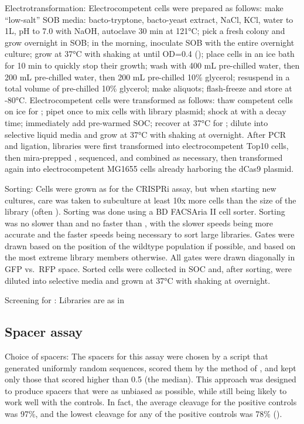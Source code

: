 \documentclass[10pt,oneside]{article}
\begin{document}
Electrotransformation: Electrocompetent cells were prepared as follows: make ``low-salt'' SOB media:  bacto-tryptone,  bacto-yeast extract,   NaCl,   KCl, water to 1L, pH to 7.0 with NaOH, autoclave 30 min at 121°C; pick a fresh colony and grow overnight in  SOB; in the morning, inoculate  SOB with the entire overnight culture; grow at 37°C with shaking at  until OD=0.4 (); place cells in an ice bath for 10 min to quickly stop their growth; wash with 400 mL pre-chilled water, then 200 mL pre-chilled water, then 200 mL pre-chilled 10\% glycerol; resuspend in a total volume of  pre-chilled 10\% glycerol; make  aliquots; flash-freeze and store at -80°C.  Electrocompetent cells were transformed as follows: thaw competent cells on ice for ; pipet once to mix cells with   library plasmid; shock at  with a  decay time; immediately add  pre-warmed SOC; recover at 37°C for ; dilute into selective liquid media and grow at 37°C with shaking at  overnight.  After PCR and ligation, libraries were first transformed into electrocompetent Top10 cells, then mira-prepped \autocite{pronobis2016}, sequenced, and combined as necessary, then transformed again into electrocompetent MG1655 cells already harboring the dCas9 plasmid.

Sorting: Cells were grown as for the CRISPRi assay, but when starting new  cultures, care was taken to subculture at least 10x more cells than the size of the library (often ).  Sorting was done using a BD FACSAria II cell sorter.  Sorting was no slower than  and no faster than , with the slower speeds being more accurate and the faster speeds being necessary to sort large libraries.  Gates were drawn based on the position of the wildtype population if possible, and based on the most extreme library members otherwise.  All gates were drawn diagonally in GFP vs.\ RFP space.  Sorted cells were collected in  SOC and, after sorting, were diluted into selective media and grown at 37°C with shaking at  overnight.

Screening for \ligrnaB{}: Libraries are as in 

\subsection{Spacer assay}

Choice of spacers: The spacers for this assay were chosen by a script that generated uniformly random sequences, scored them by the method of , and kept only those that scored higher than 0.5 (the median).  This approach was designed to produce spacers that were as unbiased as possible, while still being likely to work well with the controls.  In fact, the average cleavage for the positive controls was 97\%, and the lowest cleavage for any of the positive controls was 78\% ().
\end{document}
